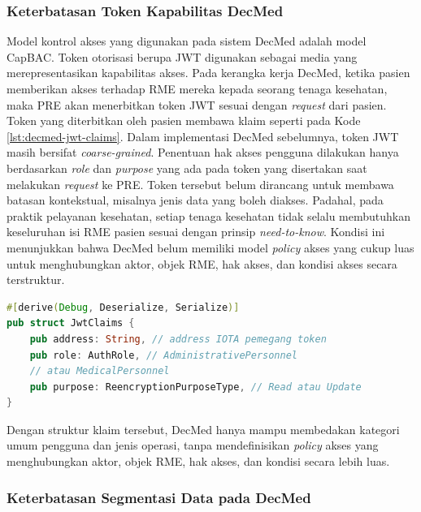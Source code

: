 \documentclass[bahasa, 12pt, a4paper, onecolumn, oneside, final]{report}
\begin{document}
\subsubsection{Keterbatasan Token Kapabilitas DecMed}
\label{subsubsec:keterbatasan-token-kapabilitas-decmed}

Model kontrol akses yang digunakan pada sistem DecMed adalah model CapBAC. Token otorisasi berupa JWT digunakan sebagai media yang merepresentasikan kapabilitas akses. Pada kerangka kerja DecMed, ketika pasien memberikan akses terhadap RME mereka kepada seorang tenaga kesehatan, maka PRE akan menerbitkan token JWT sesuai dengan \textit{request} dari pasien. Token yang diterbitkan oleh pasien membawa klaim seperti pada Kode \ref{lst:decmed-jwt-claims}. Dalam implementasi DecMed sebelumnya, token JWT masih bersifat \textit{coarse-grained}. Penentuan hak akses pengguna dilakukan hanya berdasarkan \textit{role} dan \textit{purpose} yang ada pada token yang disertakan saat melakukan \textit{request} ke PRE. Token tersebut belum dirancang untuk membawa batasan kontekstual, misalnya jenis data yang boleh diakses. Padahal, pada praktik pelayanan kesehatan, setiap tenaga kesehatan tidak selalu membutuhkan keseluruhan isi RME pasien sesuai dengan prinsip \textit{need-to-know}. Kondisi ini menunjukkan bahwa DecMed belum memiliki model \textit{policy} akses yang cukup luas untuk menghubungkan aktor, objek RME, hak akses, dan kondisi akses secara terstruktur.

\begin{lstlisting}[language=Rust, caption={Struktur klaim JWT pada DecMed}, label={lst:decmed-jwt-claims}]
#[derive(Debug, Deserialize, Serialize)]
pub struct JwtClaims {
    pub address: String, // address IOTA pemegang token
    pub role: AuthRole, // AdministrativePersonnel 
    // atau MedicalPersonnel
    pub purpose: ReencryptionPurposeType, // Read atau Update
}
\end{lstlisting}

Dengan struktur klaim tersebut, DecMed hanya mampu membedakan kategori umum pengguna dan jenis operasi, tanpa mendefinisikan \textit{policy} akses yang menghubungkan aktor, objek RME, hak akses, dan kondisi secara lebih luas.

\subsubsection{Keterbatasan Segmentasi Data pada DecMed}
\label{subsubsec:keterbatasan-segmentasi-data-decmed}
\end{document}

